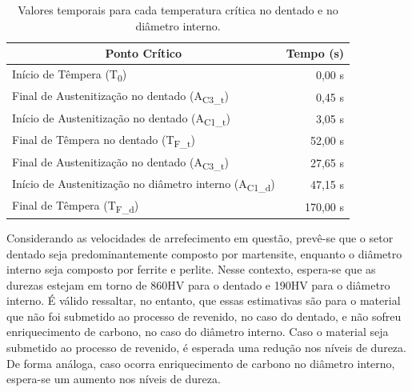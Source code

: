 \begin{table}[htb]
    \centering
    \caption[Valores temporais para cada temperatura crítica]{Valores temporais para cada temperatura crítica no dentado e no diâmetro interno.}
    \label{tab:pontos_sim}
    \begin{tabular}{lr} 
    \toprule
    \multicolumn{1}{c}{\textbf{Ponto Crítico}}            & \multicolumn{1}{c}{\textbf{Tempo (s)}}                         \\ 
    \hline\hline
    Início de Têmpera (T\textsubscript{0})                                & 0,00 s                                         \\ 
    \hline
    Final de Austenitização no dentado (A\textsubscript{C3\_t})           & 0,45 s                                         \\
    Início de Austenitização no dentado (A\textsubscript{C1\_t})          & 3,05 s                                         \\
    Final de Têmpera no dentado (T\textsubscript{F\_t})                   & 52,00 s                                        \\ 
    \hline\hline
    Final de Austenitização no dentado (A\textsubscript{C3\_t})           & 27,65 s                                        \\
    Início de Austenitização no diâmetro interno (A\textsubscript{C1\_d}) & 47,15 s                                        \\ 
    Final de Têmpera (T\textsubscript{F\_d})                              & 170,00 s                                       \\
    \bottomrule
    \end{tabular}
\end{table}
\par
Considerando as velocidades de arrefecimento em questão, prevê-se que o setor dentado seja predominantemente composto por martensite, enquanto o diâmetro interno seja composto por ferrite e perlite. Nesse contexto, espera-se que as durezas estejam em torno de 860HV para o dentado e 190HV para o diâmetro interno. É válido ressaltar, no entanto, que essas estimativas são para o material que não foi submetido ao processo de revenido, no caso do dentado, e não sofreu enriquecimento de carbono, no caso do diâmetro interno. Caso o material seja submetido ao processo de revenido, é esperada uma redução nos níveis de dureza. De forma análoga, caso ocorra enriquecimento de carbono no diâmetro interno, espera-se um aumento nos níveis de dureza.
